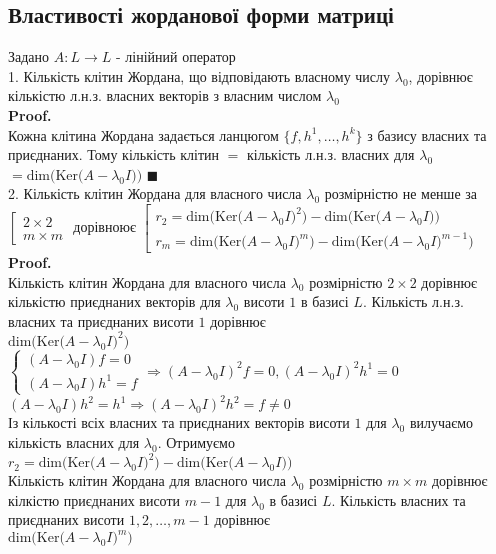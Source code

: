 \documentclass[a4paper, 14pt]{extarticle}
\def\proof{\textbf{Proof.}\\}
\def\bigline{\vspace{5mm}\\}
\def\qed{$\blacksquare$}
\def\dim#1{\textrm{dim} {#1}}
\def\ker#1{\textrm{Ker} {#1}}
\begin{document}
\subsection{Властивості жорданової форми матриці}
Задано $A: L \to L$ - лінійний оператор\\
1. Кількість клітин Жордана, що відповідають власному числу $\lambda_0$, дорівнює кількістю л.н.з. власних векторів з власним числом $\lambda_0$\\
\proof
Кожна клітина Жордана задається ланцюгом $\{f, h^1, \dots, h^k\}$ з базису власних та приєднаних. Тому кількість клітин $=$ кількість л.н.з. власних для $\lambda_0$ $= \dim(\ker (A-\lambda_0 I))$ \qed
\bigline
2. Кількість клітин Жордана для власного числа $\lambda_0$ розмірністю не менше за $\left[ \begin{gathered} 2 \times 2 \\ m \times m \end{gathered} \right.$ дорівноює $\left[ \begin{gathered} r_2 = \dim(\ker(A-\lambda_0 I)^2) - \dim(\ker(A-\lambda_0 I)) \\ r_m = \dim(\ker(A-\lambda_0 I)^m) - \dim(\ker(A-\lambda_0 I)^{m-1}) \end{gathered} \right.$\\
\proof
Кількість клітин Жордана для власного числа $\lambda_0$ розмірністю $2 \times 2$ дорівнює кількістю приєднаних векторів для $\lambda_0$ висоти $1$ в базисі $L$. Кількість л.н.з. власних та приєднаних висоти $1$ дорівнює \\ $\dim(\ker(A-\lambda_0 I)^2)$\\
$\begin{cases}
(A-\lambda_0 I)f = 0 \\
(A-\lambda_0 I)h^1 = f
\end{cases} \Rightarrow (A-\lambda_0 I)^2 f = 0, (A-\lambda_0 I)^2 h^1 = 0
$\\
$(A-\lambda_0 I)h^2 = h^1 \Rightarrow (A-\lambda_0 I)^2 h^2 = f \neq 0$\\
Із кількості всіх власних та приєднаних векторів висоти $1$ для $\lambda_0$ вилучаємо кількість власних для $\lambda_0$. Отримуємо \\ $r_2 = \dim(\ker(A-\lambda_0 I)^2) - \dim(\ker(A-\lambda_0 I))$
\bigline
Кількість клітин Жордана для власного числа $\lambda_0$ розмірністю $m \times m$ дорівнює кілкістю приєднаних висоти $m-1$ для $\lambda_0$ в базисі $L$. Кількість власних та приєднаних висоти $1,2,\dots,m-1$ дорівнює  \\ $\dim (\ker(A-\lambda_0 I)^m)$\\
\end{document}
